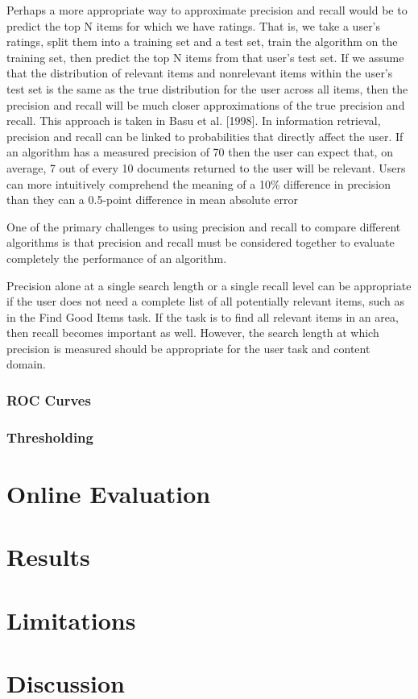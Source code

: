 Perhaps a more appropriate way to approximate precision and recall would
be to predict the top N items for which we have ratings. That is, we take a
user’s ratings, split them into a training set and a test set, train the algorithm
on the training set, then predict the top N items from that user’s test set. If we
assume that the distribution of relevant items and nonrelevant items within
the user’s test set is the same as the true distribution for the user across all
items, then the precision and recall will be much closer approximations of the
true precision and recall. This approach is taken in Basu et al. [1998].
In information retrieval, precision and recall can be linked to probabilities
that directly affect the user. If an algorithm has a measured precision of 70%
then the user can expect that, on average, 7 out of every 10 documents returned
to the user will be relevant. Users can more intuitively comprehend the meaning
of a 10\% difference in precision than they can a 0.5-point difference in mean
absolute error

One of the primary challenges to using precision and recall to compare different
algorithms is that precision and recall must be considered together to
evaluate completely the performance of an algorithm.

Precision alone at a single search length or a single recall level can be appropriate
if the user does not need a complete list of all potentially relevant
items, such as in the Find Good Items task. If the task is to find all relevant
items in an area, then recall becomes important as well. However, the search
length at which precision is measured should be appropriate for the user task
and content domain.


\subsubsection{ROC Curves}

\subsubsection{Thresholding}

\section{Online Evaluation}

\section{Results}

\section{Limitations}

\section{Discussion}


